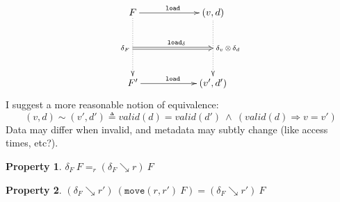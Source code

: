 \documentclass[10pt,twoside,a4paper]{article}
\theoremstyle{theorem}
\theoremstyle{lemma}
\theoremstyle{property}
\newtheorem{property}{Property}[section]
\begin{document}
\begin{displaymath}
	\xymatrix@=2cm{
	F\ar@{->}[r]^{\mathtt{load}}
	\ar@{..>}[d]_{\delta_F}="a"
	& (v,d)\ar@{..>}[d]^{\delta_v \,\otimes\, \delta_d}="b"\\
	F' \ar@{->}[r]^{\mathtt{load}}
	& (v',d')
	\ar@{=>}^{\mathtt{load_\delta}}"a";"b"
	}
\end{displaymath}
I suggest a more reasonable notion of equivalence:
\begin{displaymath}
	(v,d) \sim (v',d') \triangleq valid(d)=valid(d') ~\wedge~ (valid(d) \Rightarrow v = v')
\end{displaymath}
Data may differ when invalid, and metadata may subtly change (like access times, etc?).

\begin{property}
	$\delta_F ~ F =_r (\delta_F \searrow r) ~ F$
\label{prop:deltaFUnder1}
\end{property}

\begin{property}
	$(\delta_F \searrow r') ~ (\mathtt{move}(r,r') ~ F) = (\delta_F \searrow r') ~ F$
\label{prop:deltaFUnder2}
\end{property}
\end{document}
